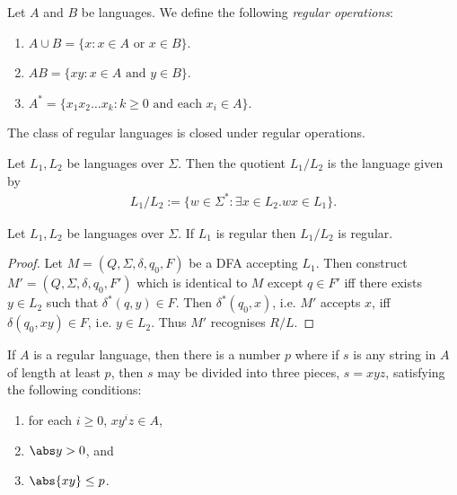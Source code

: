 \documentclass{article}
\begin{document}
\begin{definition*}
	Let $A$ and $B$ be languages. We define the following \emph{regular operations}:
	\begin{enumerate}
		\item $A\cup B=\{x : x \in A \text{ or } x \in B\}$.
		\item $AB=\{xy : x \in A \text{ and } y \in B\}$.
		\item $A^* = \{x_1x_2\dots x_k:k\geq 0 \text{ and each }x_i\in A\}$.
	\end{enumerate}
\end{definition*}

\begin{theorem*}[Sipser p. 45, 60, 62]
	The class of regular languages is closed under regular operations.
\end{theorem*}

\begin{definition*}[Quotient]
	Let $L_1,L_2$ be languages over $\Sigma$. Then the quotient $L_1/L_2$ is the language 
	given by 
	\begin{align*}
		L_1/L_2 := \{w \in \Sigma^* : \exists x\in L_2. wx \in L_1\}.
	\end{align*}
\end{definition*}

\begin{theorem*}
	Let $L_1,L_2$ be languages over $\Sigma$. If $L_1$ is regular then $L_1/L_2$ is regular.
	\begin{proof}
		Let $M=(Q, \Sigma, \delta, q_0, F)$ be a DFA accepting $L_1$. Then construct $M'=(Q,\Sigma,\delta,q_0,F')$
		which is identical to $M$ except $q\in F'$ iff there exists $y\in L_2$ such that 
		$\delta^*(q, y)\in F$.
		Then $\delta^*(q_0, x)$, i.e. $M'$ accepts $x$, iff $\delta(q_0,xy)\in F$, i.e. 
		$y\in L_2$. Thus $M'$ recognises $R/L$.
	\end{proof}
\end{theorem*}

\begin{theorem*}
	If $A$ is a regular language, then there is a number $p$ where if $s$
	is any string in $A$ of length at least $p$, then $s$ may be divided
	into three pieces, $s=xyz$, satisfying the following conditions:
	\begin{enumerate}
		\item for each $i\geq 0$, $xy^iz\in A$,
		\item $\abs y > 0$, and
		\item $\abs{xy} \leq p$.
	\end{enumerate}
\end{theorem*}
\end{document}
